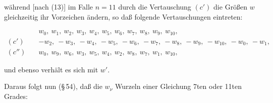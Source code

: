 während [nach (13)] im Falle $n = 11$ durch die Vertauschung $(c')$ die Größen $w$ gleichzeitig ihr Vorzeichen ändern, so daß folgende Vertauschungen eintreten:

\[
\begin{aligned}
& w_0,\ w_1,\ w_2,\ w_3,\ w_4,\ w_5,\ w_6,\ w_7,\ w_8,\ w_9,\ w_{10},\\
(c') \quad & -w_2,\ -w_3,\ -w_4,\ -w_5,\ -w_6,\ -w_7,\ -w_8,\ -w_9,\ -w_{10},\ -w_0,\ -w_1,\\
(c'') \quad & w_0,\ w_9,\ w_6,\ w_3,\ w_5,\ w_4,\ w_2,\ w_8,\ w_7,\ w_1,\ w_{10},
\end{aligned}
\]

und ebenso verhält es sich mit $w'$.

Daraus folgt nun (\S\,54), daß die $w_\nu$ Wurzeln einer Gleichung 7ten oder 11ten Grades:


